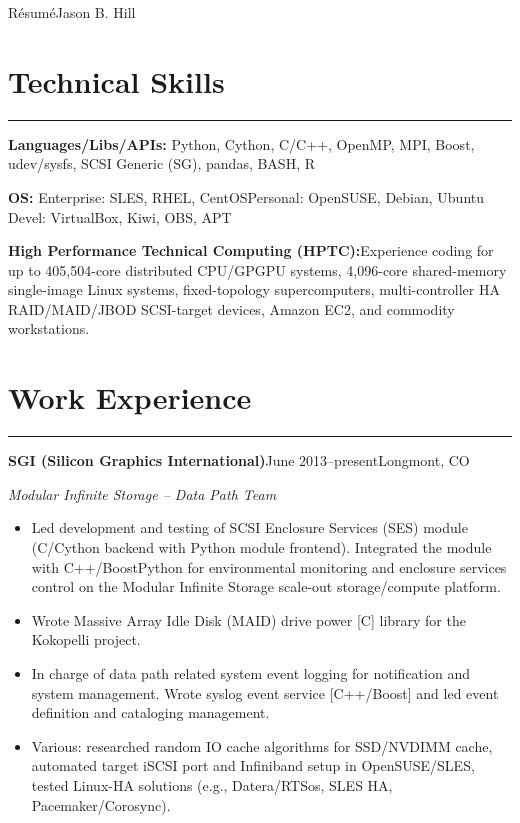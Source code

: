 \documentclass[letterpaper,10pt]{article}
\newcommand{\mblue}{\color{darkblue}}
\begin{document}
\pagestyle{empty}

{\large\mblue R\'esum\'e}\hfill{\Huge\mblue Jason B. Hill}


\section*{\mblue Technical Skills}

\vspace{-2.15pc} {\hfill\mblue\rule{5.37in}{0.02cm}}

\vspace{1pc}\textbf{Languages/Libs/APIs:} Python, Cython, C/C++, OpenMP, MPI, Boost, udev/sysfs,
SCSI Generic (SG), pandas, BASH, R

\bigbreak\textbf{OS:} Enterprise: SLES, RHEL, CentOS\qquad Personal: OpenSUSE, Debian, Ubuntu\qquad
Devel: VirtualBox, Kiwi, OBS, APT

\bigbreak\textbf{High Performance Technical Computing (HPTC):}\quad Experience coding for up to
405,504-core distributed CPU/GPGPU systems, 4,096-core shared-memory single-image Linux systems,
fixed-topology supercomputers, multi-controller HA RAID/MAID/JBOD SCSI-target devices, Amazon EC2,
and commodity workstations.

\section*{\mblue Work Experience}

\vspace{-2.15pc}
{\hfill\mblue\rule{5.245in}{0.02cm}}

\vspace{1pc}
\textbf{SGI (Silicon Graphics International)}\quad June 2013--present\hfill Longmont, CO

\bigbreak
\textit{Modular Infinite Storage -- Data Path Team}

\begin{itemize}
\item Led development and testing of SCSI Enclosure Services (SES) module (C/Cython backend with
Python module frontend). Integrated the module with C++/BoostPython for environmental monitoring and
enclosure services control on the Modular Infinite Storage scale-out storage/compute platform.

\item Wrote Massive Array Idle Disk (MAID) drive power [C] library for the Kokopelli project.

\item In charge of data path related system event logging for notification and system management.
Wrote syslog event service [C++/Boost] and led event definition and cataloging management.

\item Various: researched random IO cache algorithms for SSD/NVDIMM cache, automated target iSCSI
port and Infiniband setup in OpenSUSE/SLES, tested Linux-HA solutions (e.g., Datera/RTSos, SLES HA,
Pacemaker/Corosync).
\end{itemize}
\end{document}
